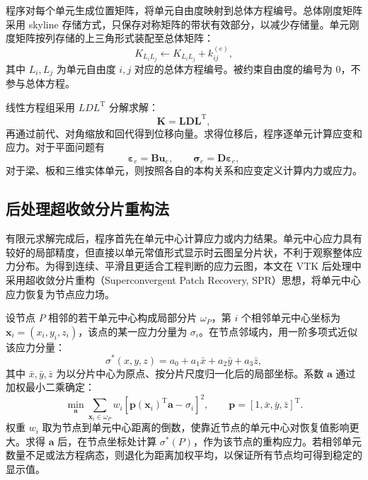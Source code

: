 \documentclass[UTF8,a4paper,zihao=-4]{ctexart}
\newcommand{\T}{\mathrm{T}}
\newcommand{\Dmat}{\bm{D}}
\newcommand{\Bmat}{\bm{B}}
\newcommand{\Kmat}{\bm{K}}
\newcommand{\Uvec}{\bm{u}}
\newcommand{\epsvec}{\bm{\varepsilon}}
\newcommand{\sigvec}{\bm{\sigma}}
\begin{document}
程序对每个单元生成位置矩阵，将单元自由度映射到总体方程编号。总体刚度矩阵采用 skyline 存储方式，只保存对称矩阵的带状有效部分，以减少存储量。单元刚度矩阵按列存储的上三角形式装配至总体矩阵：
\begin{equation}
    K_{L_iL_j}
    \leftarrow
    K_{L_iL_j}
    +
    k_{ij}^{(e)} ,
\end{equation}
其中 $L_i,L_j$ 为单元自由度 $i,j$ 对应的总体方程编号。被约束自由度的编号为 0，不参与总体方程。

线性方程组采用 $LDL^{\T}$ 分解求解：
\begin{equation}
    \Kmat = \bm{L}\bm{D}\bm{L}^{\T},
\end{equation}
再通过前代、对角缩放和回代得到位移向量。求得位移后，程序逐单元计算应变和应力。对于平面问题有
\begin{equation}
    \epsvec_e = \Bmat \Uvec_e,\qquad
    \sigvec_e = \Dmat \epsvec_e ,
\end{equation}
对于梁、板和三维实体单元，则按照各自的本构关系和应变定义计算内力或应力。

\subsection{后处理超收敛分片重构法}

有限元求解完成后，程序首先在单元中心计算应力或内力结果。单元中心应力具有较好的局部精度，但直接以单元常值形式显示时云图呈分片状，不利于观察整体应力分布。为得到连续、平滑且更适合工程判断的应力云图，本文在 VTK 后处理中采用超收敛分片重构（Superconvergent Patch Recovery, SPR）思想，将单元中心应力恢复为节点应力场。

设节点 $P$ 相邻的若干单元中心构成局部分片 $\omega_P$，第 $i$ 个相邻单元中心坐标为 $\bm{x}_i=(x_i,y_i,z_i)$，该点的某一应力分量为 $\sigma_i$。在节点邻域内，用一阶多项式近似该应力分量：
\begin{equation}
    \sigma^{*}(x,y,z)
    =
    a_0+a_1\bar{x}+a_2\bar{y}+a_3\bar{z},
\end{equation}
其中 $\bar{x},\bar{y},\bar{z}$ 为以分片中心为原点、按分片尺度归一化后的局部坐标。系数 $\bm{a}$ 通过加权最小二乘确定：
\begin{equation}
    \min_{\bm{a}}
    \sum_{\bm{x}_i\in\omega_P}
    w_i
    \left[
        \bm{p}(\bm{x}_i)^{\T}\bm{a}
        -
        \sigma_i
    \right]^2 ,
    \qquad
    \bm{p}=[1,\bar{x},\bar{y},\bar{z}]^{\T}.
\end{equation}
权重 $w_i$ 取为节点到单元中心距离的倒数，使靠近节点的单元中心对恢复值影响更大。求得 $\bm{a}$ 后，在节点坐标处计算 $\sigma^{*}(P)$，作为该节点的重构应力。若相邻单元数量不足或法方程病态，则退化为距离加权平均，以保证所有节点均可得到稳定的显示值。
\end{document}
